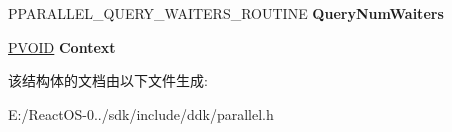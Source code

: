 \begin{DoxyCompactItemize}
\mbox{\label{struct___p_a_r_a_l_l_e_l___p_o_r_t___i_n_f_o_r_m_a_t_i_o_n_a22c45b7d2d81ce597c67338c56bf1e0f}} 
P\+P\+A\+R\+A\+L\+L\+E\+L\+\_\+\+Q\+U\+E\+R\+Y\+\_\+\+W\+A\+I\+T\+E\+R\+S\+\_\+\+R\+O\+U\+T\+I\+NE {\bfseries Query\+Num\+Waiters}
\item 
\mbox{\label{struct___p_a_r_a_l_l_e_l___p_o_r_t___i_n_f_o_r_m_a_t_i_o_n_ada522521ba222f913dfa7915bac3f999}} 
\hyperlink{interfacevoid}{P\+V\+O\+ID} {\bfseries Context}
\end{DoxyCompactItemize}


该结构体的文档由以下文件生成\+:\begin{DoxyCompactItemize}
\item 
E\+:/\+React\+O\+S-\/0../sdk/include/ddk/parallel.\+h\end{DoxyCompactItemize}
